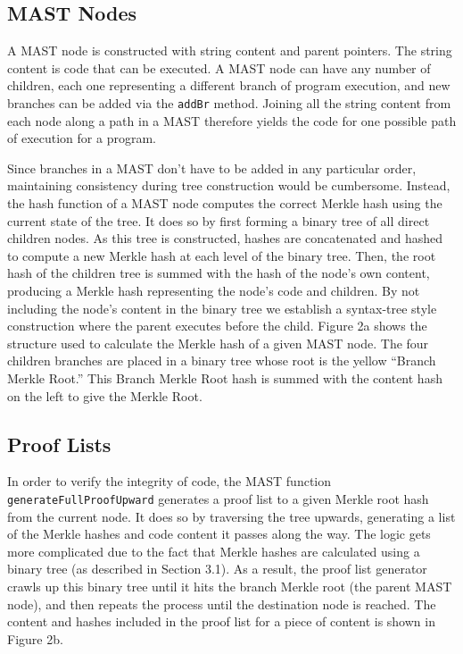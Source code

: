 \documentclass{vldb}
\begin{document}
\subsection{MAST Nodes}

A MAST node is constructed with string content and parent pointers.
The string content is code that can be executed. A MAST node can have
any number of children, each one representing a different branch of program
execution, and new branches can be added via the \texttt{addBr} method. Joining all the
string content from each node along a path in a MAST therefore yields the code
for one possible path of execution for a program.
 
Since branches in a MAST don't have to be added in any particular order,
maintaining consistency during tree construction would be cumbersome. Instead,
the hash function of a MAST node computes the correct Merkle hash using the
current state of the tree. It does so by first forming a binary tree of all
direct children nodes. As this tree is constructed, hashes are concatenated and
hashed to compute a new Merkle hash at each level of the binary tree. Then, the
root hash of the children tree is summed with the hash of the node's own
content, producing a Merkle hash representing the node's code and children. By
not including the node's content in the binary tree we establish a syntax-tree
style construction where the parent executes before the child. Figure 2a shows
the structure used to calculate the Merkle hash of a given MAST node. The four
children branches are placed in a binary tree whose root is the yellow ``Branch
Merkle Root.'' This Branch Merkle Root hash is summed with the content hash on
the left to give the Merkle Root.

\vfill

\subsection{Proof Lists}

In order to verify the integrity of code, the MAST function
\texttt{generateFullProofUpward}  generates a proof list to a given Merkle root
hash from the current node. It does so by traversing the tree upwards,
generating a list of the Merkle hashes and code content it passes along the
way. The logic gets more complicated due to the fact that Merkle hashes are
calculated using a binary tree (as described in Section 3.1). As a result, the
proof list generator crawls up this binary tree until it hits the branch Merkle
root (the parent MAST node), and then repeats the process until the destination
node is reached. The content and hashes included in the proof list for a piece
of content is shown in Figure 2b.
\end{document}
